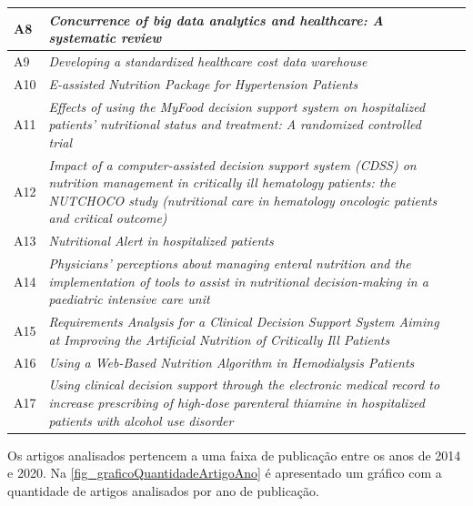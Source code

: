 \begin{quadro}[htb]
\begin{tabular}{|p{}|p{7cm}|p{5cm}|}
    \hline
	A8  & \textit{Concurrence of big data analytics and healthcare: A systematic review}& \cite{metha2018} \\ \hline
	A9  & \textit{Developing a standardized healthcare cost data warehouse} & \cite{visscher2017} \\ \hline
	A10  & \textit{E-assisted Nutrition Package for Hypertension Patients}& \cite{boonapai2016} \\ \hline
	A11 & \textit{Effects of using the MyFood decision support system on hospitalized patients' nutritional status and treatment: A randomized controlled trial} & \cite{paulsen2020} \\ \hline
	A12  & \textit{Impact of a computer-assisted decision support system (CDSS) on nutrition management in critically ill hematology patients: the NUTCHOCO study (nutritional care in hematology oncologic patients and critical outcome)} & \cite{ettori2019} \\ \hline
	A13  & \textit{Nutritional Alert in hospitalized patients} & \cite{brieux2014} \\ \hline
	A14  & \textit{Physicians' perceptions about managing enteral nutrition and the implementation of tools to assist in nutritional decision-making in a paediatric intensive care unit}& \cite{moullet2020} \\ \hline
	A15  & \textit{Requirements Analysis for a Clinical Decision Support System Aiming at Improving the Artificial Nutrition of Critically Ill Patients}& \cite{schuttler2017} \\ \hline
	A16  & \textit{Using a Web-Based Nutrition Algorithm in Hemodialysis Patients} & \cite{steiber2015} \\ \hline
	A17  & \textit{Using clinical decision support through the electronic medical record to increase prescribing of high-dose parenteral thiamine in hospitalized patients with alcohol use disorder} & \cite{wai2019} \\ \hline
\end{tabular}
\end{quadro} 

Os artigos analisados pertencem a uma faixa de publicação entre os anos de 2014 e 2020. Na \autoref{fig_graficoQuantidadeArtigoAno} é apresentado um gráfico com a quantidade de artigos analisados por ano de publicação.
\newline
\newline
\newline
\newline
\newline
\newline
\newline

